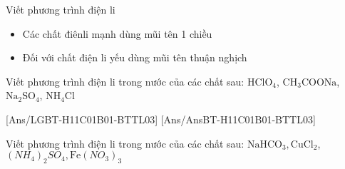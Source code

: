 \documentclass[Main.tex]{subfiles}
\begin{document}
\begin{dang}{Viết phương trình điện li}
\end{dang}
\begin{pp}
\begin{itemize}
	\item Các chất điênli mạnh dùng mũi tên 1 chiều
	\item Đối với chất điện li yếu dùng mũi tên thuận nghịch
\end{itemize}
\end{pp}
\begin{vd}
Viết phương trình điện li trong nước của các chất sau: $\mathrm{HClO}_4$, $\mathrm{CH_3COONa}$, $\mathrm{Na}_2\mathrm{SO}_4$, $\mathrm{NH}_4\mathrm{Cl}$
\end{vd}

[Ans/LGBT-H11C01B01-BTTL03]
[Ans/AnsBT-H11C01B01-BTTL03]
\luuloigiaibt
\hienthiloigiaibt
\begin{bt}
Viết phương trình điện li trong nước của các chất sau: $\mathrm{NaHCO}_3, \mathrm{CuCl}_2$, $\left(NH_4\right)_2SO_4, \mathrm{Fe}\left(NO_3\right)_3$
\end{bt}
\end{document}
